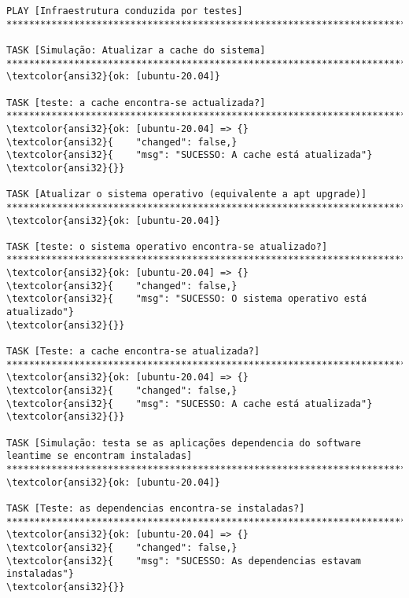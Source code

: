 \documentclass{scrartcl}
\begin{document}
\begin{Verbatim}
PLAY [Infraestrutura conduzida por testes] **************************************************************************************************************************************************

TASK [Simulação: Atualizar a cache do sistema] **********************************************************************************************************************************************
\textcolor{ansi32}{ok: [ubuntu-20.04]}

TASK [teste: a cache encontra-se actualizada?] **********************************************************************************************************************************************
\textcolor{ansi32}{ok: [ubuntu-20.04] => {}
\textcolor{ansi32}{    "changed": false,}
\textcolor{ansi32}{    "msg": "SUCESSO: A cache está atualizada"}
\textcolor{ansi32}{}}

TASK [Atualizar o sistema operativo (equivalente a apt upgrade)] ****************************************************************************************************************************
\textcolor{ansi32}{ok: [ubuntu-20.04]}

TASK [teste: o sistema operativo encontra-se atualizado?] ***********************************************************************************************************************************
\textcolor{ansi32}{ok: [ubuntu-20.04] => {}
\textcolor{ansi32}{    "changed": false,}
\textcolor{ansi32}{    "msg": "SUCESSO: O sistema operativo está atualizado"}
\textcolor{ansi32}{}}

TASK [Teste: a cache encontra-se atualizada?] ***********************************************************************************************************************************************
\textcolor{ansi32}{ok: [ubuntu-20.04] => {}
\textcolor{ansi32}{    "changed": false,}
\textcolor{ansi32}{    "msg": "SUCESSO: A cache está atualizada"}
\textcolor{ansi32}{}}

TASK [Simulação: testa se as aplicações dependencia do software leantime se encontram instaladas] *******************************************************************************************
\textcolor{ansi32}{ok: [ubuntu-20.04]}

TASK [Teste: as dependencias encontra-se instaladas?] ***************************************************************************************************************************************
\textcolor{ansi32}{ok: [ubuntu-20.04] => {}
\textcolor{ansi32}{    "changed": false,}
\textcolor{ansi32}{    "msg": "SUCESSO: As dependencias estavam instaladas"}
\textcolor{ansi32}{}}


\end{Verbatim}
\end{document}
